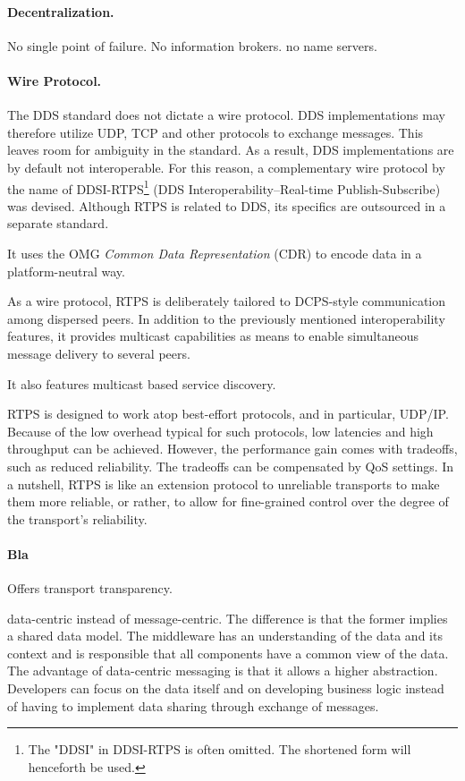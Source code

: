 \paragraph{Decentralization.}
No single point of failure. No information brokers. no name servers.

\paragraph{Wire Protocol.}
The DDS standard does not dictate a wire protocol. DDS implementations may therefore utilize UDP, TCP and other protocols to exchange messages. This leaves room for ambiguity in the standard. As a result, DDS implementations are by default not interoperable. For this reason, a complementary wire protocol by the name of DDSI-RTPS\footnote{The "DDSI" in DDSI-RTPS is often omitted. The shortened form will henceforth be used.} (DDS Interoperability--Real-time Publish-Subscribe) was devised. Although RTPS is related to DDS, its specifics are outsourced in a separate standard. \cite{rtps-2.2-standard}

It uses the OMG \emph{Common Data Representation} (CDR) to encode data in a platform-neutral way. 

As a wire protocol, RTPS is deliberately tailored to DCPS-style communication among dispersed peers. In addition to the previously mentioned interoperability features, it provides multicast capabilities as means to enable simultaneous message delivery to several peers.

It also features multicast based service discovery.

RTPS is designed to work atop best-effort protocols, and in particular, UDP/IP. Because of the low overhead typical for such protocols, low latencies and high throughput can be achieved. However, the performance gain comes with tradeoffs, such as reduced reliability. The tradeoffs can be compensated by QoS settings. In a nutshell, RTPS is like an extension protocol to unreliable transports to make them more reliable, or rather, to allow for fine-grained control over the degree of the transport's reliability.



\paragraph{Bla}
Offers transport transparency.

data-centric instead of message-centric. The difference is that the former implies a shared data model. The middleware has an understanding of the data and its context and is responsible that all components have a common view of the data.
The advantage of data-centric messaging is that it allows a higher abstraction. Developers can focus on the data itself and on developing business logic instead of having to implement data sharing through exchange of messages.

